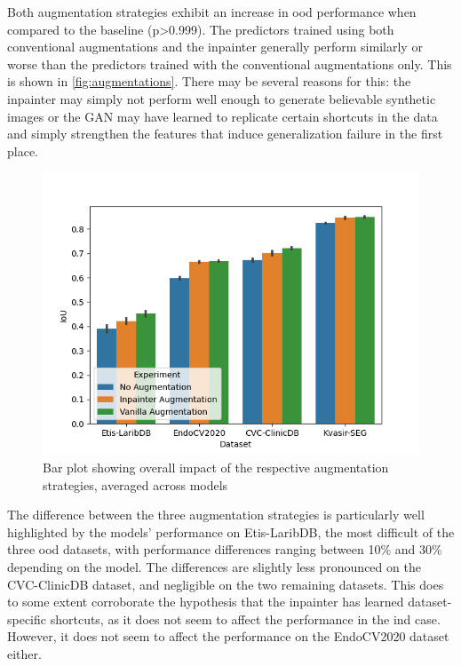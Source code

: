 Both augmentation strategies exhibit an increase in \gls{ood} performance when compared to the baseline (p>0.999). The predictors trained using both conventional augmentations and the inpainter generally perform similarly or worse than the predictors trained with the conventional augmentations only. This is shown in \autoref{fig:augmentations}. There may be several reasons for this: the inpainter may simply not perform well enough to generate believable synthetic images or the GAN may have learned to replicate certain shortcuts in the data and simply strengthen the features that induce generalization failure in the first place.

\begin{figure}
    \centering
    \includegraphics[width=\linewidth]{illustrations/augmentation_plot.png}
    \caption{Bar plot showing overall impact of the respective augmentation strategies, averaged across models}
    \label{fig:augmentations}
\end{figure}

The difference between the three augmentation strategies is particularly well highlighted by the models' performance on Etis-LaribDB, the most difficult of the three \gls{ood} datasets, with performance differences ranging between 10\% and 30\% depending on the model. The differences are slightly less pronounced on the CVC-ClinicDB dataset, and negligible on the two remaining datasets. This does to some extent corroborate the hypothesis that the inpainter has learned dataset-specific shortcuts, as it does not seem to affect the performance in the \gls{ind} case. However, it does not seem to affect the performance on the EndoCV2020 dataset either. 

